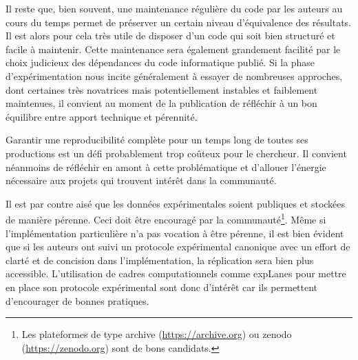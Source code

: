 Il reste que, bien souvent, une maintenance régulière du code par les auteurs au cours du temps permet de préserver un certain niveau d'équivalence des résultats. Il est alors pour cela très utile de disposer d'un code qui soit bien structuré et facile à maintenir. Cette maintenance sera également grandement facilité par le choix judicieux des dépendances du code informatique publié. Si la phase d'expérimentation nous incite généralement à essayer de nombreuses approches, dont certaines très novatrices mais potentiellement instables et faiblement maintenues, il convient au moment de la publication de réfléchir à un bon équilibre entre apport technique et pérennité.

Garantir une reproducibilité complète pour un temps long de toutes ses productions est un défi probablement trop coûteux pour le chercheur. Il convient néanmoins de réfléchir en amont à cette problématique et d'allouer l'énergie nécessaire aux projets qui trouvent intérêt dans la communauté.

Il est par contre aisé que les données expérimentales soient publiques et stockées de manière pérenne. Ceci doit être encouragé par la communauté\footnote{Les plateformes de type archive (\url{https://archive.org}) ou zenodo (\url{https://zenodo.org}) sont de bons candidats.}. Même si l'implémentation particulière n'a pas vocation à être pérenne, il est bien évident que si les auteurs ont suivi un protocole expérimental canonique avec un effort de clarté et de concision dans l'implémentation, la réplication sera bien plus accessible. L'utilisation de cadres computationnels comme expLanes pour mettre en place son protocole expérimental sont donc d'intérêt car ils permettent d'encourager de bonnes pratiques.
